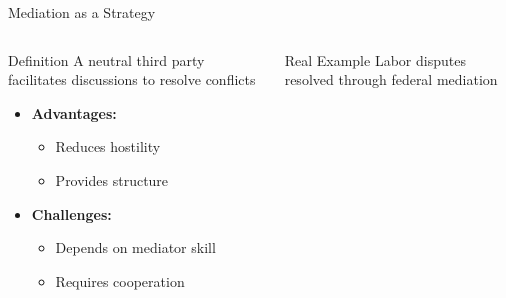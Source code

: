 \documentclass[10pt]{beamer}
\begin{document}
\begin{frame}{Mediation as a Strategy}
    \begin{columns}[T]
        \begin{column}{0.6\textwidth}
            \begin{block}{Definition}
                A neutral third party facilitates discussions to resolve conflicts
            \end{block}
            
            \begin{itemize}
                \item \textbf{Advantages:}
                \begin{itemize}
                    \item Reduces hostility
                    \item Provides structure
                \end{itemize}
                \item \textbf{Challenges:}
                \begin{itemize}
                    \item Depends on mediator skill
                    \item Requires cooperation
                \end{itemize}
            \end{itemize}
        \end{column}
        \begin{column}{0.4\textwidth}
            \begin{exampleblock}{Real Example}
                Labor disputes resolved through federal mediation
                \centering
            \end{exampleblock}
        \end{column}
    \end{columns}
\end{frame}
\end{document}
